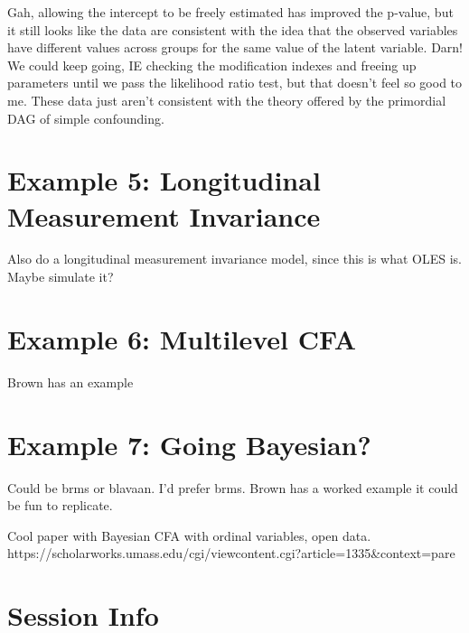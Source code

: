 \documentclass[
  letterpaper,
  DIV=11,
  numbers=noendperiod]{scrreprt}
\begin{document}
Gah, allowing the intercept to be freely estimated has improved the
p-value, but it still looks like the data are consistent with the idea
that the observed variables have different values across groups for the
same value of the latent variable. Darn! We could keep going, IE
checking the modification indexes and freeing up parameters until we
pass the likelihood ratio test, but that doesn't feel so good to me.
These data just aren't consistent with the theory offered by the
primordial DAG of simple confounding.

\hypertarget{example-5-longitudinal-measurement-invariance}{%
\section*{Example 5: Longitudinal Measurement
Invariance}\label{example-5-longitudinal-measurement-invariance}}


Also do a longitudinal measurement invariance model, since this is what
OLES is. Maybe simulate it?

\hypertarget{example-6-multilevel-cfa}{%
\section*{Example 6: Multilevel CFA}\label{example-6-multilevel-cfa}}


Brown has an example

\hypertarget{example-7-going-bayesian}{%
\section*{Example 7: Going Bayesian?}\label{example-7-going-bayesian}}


Could be brms or blavaan. I'd prefer brms. Brown has a worked example it
could be fun to replicate.

Cool paper with Bayesian CFA with ordinal variables, open data.
https://scholarworks.umass.edu/cgi/viewcontent.cgi?article=1335\&context=pare

\hypertarget{session-info}{%
\section{Session Info}\label{session-info}}
\end{document}
